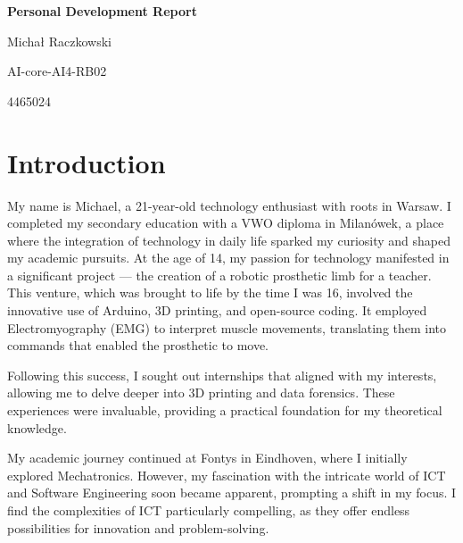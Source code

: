 \documentclass[a4paper, 11pt]{article}
\begin{document}
\begin{titlepage}
  \thispagestyle{titlepage}
  \begin{center} 
    \end{center}


	\setlength{\parindent}{0pt}
	\vspace*{.15\textheight}
	\medbreak
	{\Huge\bfseries\color{MSBlue} Personal Development Report
    \par}
	\bigbreak
    \bigbreak
	{Michał Raczkowski\par}
    \smallbreak
    {\small AI-core-AI4-RB02 \par}
    \smallbreak
    {\small 4465024\par}
\end{titlepage}



\pagebreak


\tableofcontents




\pagebreak

\section{Introduction}
My name is Michael, a 21-year-old technology enthusiast with roots in Warsaw. I completed my secondary education with a VWO diploma in Milanówek, a place where the integration of technology in daily life sparked my curiosity and shaped my academic pursuits.
\medbreak
At the age of 14, my passion for technology manifested in a significant project — the creation of a robotic prosthetic limb for a teacher. This venture, which was brought to life by the time I was 16, involved the innovative use of Arduino, 3D printing, and open-source coding. It employed Electromyography (EMG) to interpret muscle movements, translating them into commands that enabled the prosthetic to move.
\medbreak

Following this success, I sought out internships that aligned with my interests, allowing me to delve deeper into 3D printing and data forensics. These experiences were invaluable, providing a practical foundation for my theoretical knowledge.
\medbreak

My academic journey continued at Fontys in Eindhoven, where I initially explored Mechatronics. However, my fascination with the intricate world of ICT and Software Engineering soon became apparent, prompting a shift in my focus. I find the complexities of ICT particularly compelling, as they offer endless possibilities for innovation and problem-solving.
\medbreak
\end{document}
